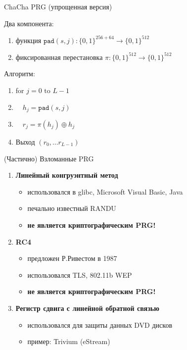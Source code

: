 \documentclass[usenames,dvipsnames,8pt,aspectratio=169]{beamer}
\begin{document}
\begin{frame}{ChaCha PRG (упрощенная версия)}
\LARGE

Два компонента:
\begin{enumerate}
\itemsep 8pt
\item функция $\texttt{pad}(s, j) : \{0,1\}^{256 + 64} \rightarrow \{0,1\}^{512}$
\item фиксированная перестановка $\pi  : \{0,1\}^{512} \rightarrow \{0,1\}^{512} $
\end{enumerate}

\vspace{30pt}

Алгоритм:
\begin{enumerate}
\item for  $j  =  0 \text{ to } L-1 $ 
\item $\quad h_j = \texttt{pad}(s, j) $
\item $\quad r_j = \pi(h_j) \oplus h_j$
\item Выход $(r_0, \ldots r_{L-1})$
\end{enumerate}
\end{frame}

\begin{frame}{(Частично) Взломанные PRG}
\LARGE
\begin{enumerate}
\itemsep1.5em 
\item {\color{Orange}\textbf{Линейный конгруэнтный метод}} 
\begin{itemize}
\LARGE
\itemsep5pt  
\item использовался в glibc, Microsoft Visual Basic, Java
\item печально известный RANDU
\item \textbf{не является криптографическим PRG!}
\end{itemize}

\item {\color{Orange}\textbf{RC4}} 
\begin{itemize}
\LARGE
\itemsep5pt 
\item предложен Р.Ривестом в 1987
\item использовался TLS, 802.11b WEP
\item \textbf{не является криптографическим PRG!}
\end{itemize}

\item {\color{Orange}\textbf{Регистр сдвига с линейной обратной связью }}
\begin{itemize}
\LARGE
\itemsep5pt
\item использовался для защиты данных DVD дисков
\item пример: Trivium (eStream)
\end{itemize} 
\end{enumerate}

\end{frame}
\end{document}
